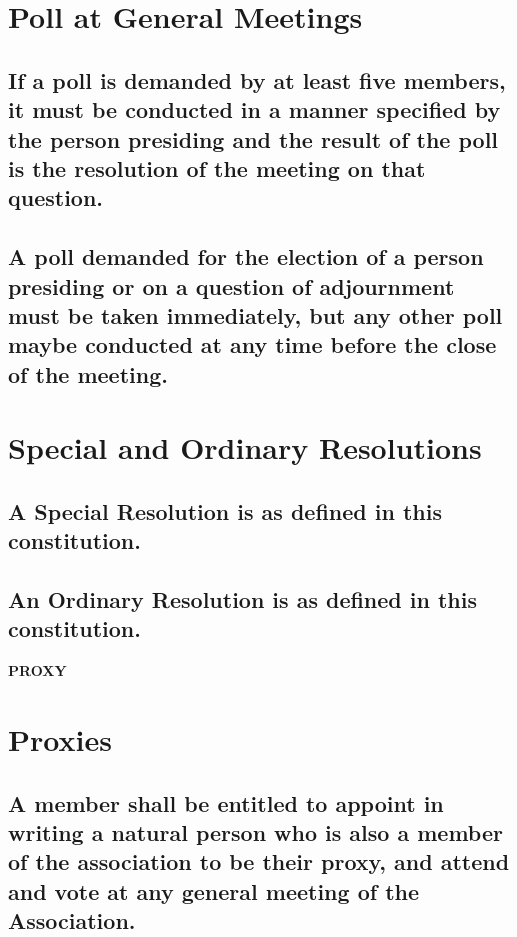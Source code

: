 \documentclass{article}
\newenvironment{subs}
  {\adjustwidth{2em}{0pt}}
  {\endadjustwidth}
\begin{document}
\section{Poll at General Meetings}
\begin{subs}
\subsection{If a poll is demanded by at least five members, it must be conducted in a manner specified by the person presiding and the result of the poll is the resolution of the meeting on that question.}
\subsection{A poll demanded for the election of a person presiding or on a question of adjournment must be taken immediately, but any other poll maybe conducted at any time before the close of the meeting.}
\end{subs}

\section{Special and Ordinary Resolutions}
\begin{subs}
\subsection{A Special Resolution is as defined in this constitution.}
\subsection{An Ordinary Resolution is as defined in this constitution.}
\end{subs}

\vspace{5mm}
{\large\bf PROXY\par}
\hrulefill
\vspace{5mm}

\section{Proxies}
\begin{subs}
\subsection{A member shall be entitled to appoint in writing a natural person who is also a member of the association to be their proxy, and attend and vote at any general meeting of the Association.}
\end{subs}
\end{document}
